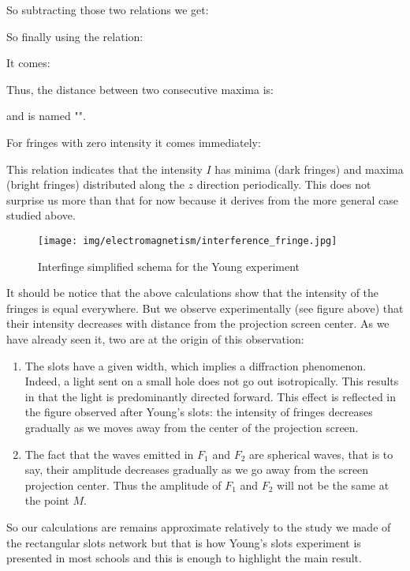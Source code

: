 	So subtracting those two relations we get:
	
	So finally using the relation:
	
	It comes:
	
	Thus, the distance between two consecutive maxima is:
		
	and is named "".

	For fringes with zero intensity it comes immediately:
	
	This relation indicates that the intensity $I$ has minima (dark fringes) and maxima (bright fringes) distributed along the $z$ direction periodically. This does not surprise us more than that for now because it derives from the more general case studied above.
	\begin{figure}[H]
		\centering
		\texttt{[image: img/electromagnetism/interference\_fringe.jpg]}
		\caption[]{Interfinge simplified schema for the Young experiment}
	\end{figure}
	It should be notice that the above calculations show that the intensity of the fringes is equal everywhere. But we observe experimentally (see figure above) that their intensity decreases with distance from the projection screen center. As we have already seen it, two are at the origin of this observation:
	\begin{enumerate}
		\item The slots have a given width, which implies a diffraction phenomenon. Indeed, a light sent on a small hole does not go out isotropically. This results in that the light is predominantly directed forward. This effect is reflected in the figure observed after Young's slots: the intensity of fringes decreases gradually as we moves away from the center of the projection screen.

		\item The fact that the waves emitted in $F_1$ and $F_2$ are spherical waves, that is to say, their amplitude decreases gradually as we go away from the screen projection center. Thus the amplitude of $F_1$ and $F_2$ will not be the same at the point $M$.
	\end{enumerate}
	So our calculations are remains approximate relatively to the study we made of the rectangular slots network but that is how Young's slots experiment is presented in most schools and this is enough to highlight the main result.
	
